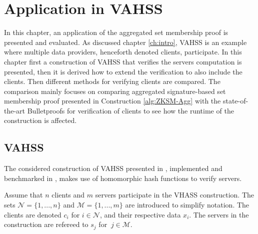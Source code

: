 \chapter{Application in VAHSS}
\label{ch:VAHSS}
In this chapter, an application of the aggregated set membership proof is presented and evaluated. As discussed chapter \ref{ch:intro}, VAHSS is an example where multiple data providers, henceforth denoted clients, participate. In this chapter first a construction of VAHSS  that verifies the servers computation is presented, then it is derived how to extend the verification to also include the clients. 
Then different methods for verifying clients are compared. The comparison   mainly focuses on comparing aggregated signature-based set membership proof presented in Construction \ref{alg:ZKSM-Agg} with the state-of-the-art Bulletproofs for verification of clients to see how the runtime of the construction is affected.


\section{VAHSS}
\label{sec:VAHSS-HSS}
The considered construction of VAHSS presented in \cite{SumItUp}, implemented and benchmarked in \cite{VAHSS}, makes use of homomorphic hash functions to verify servers.



Assume that $n$ clients and $m$ servers participate in the VHASS construction. The sets $\mathcal{N}=\{1,...,n\}$ and $\mathcal{M} = \{1,...,m\}$ are introduced to simplify notation. The clients are denoted $c_i$ for $i\in\mathcal{N}$, and their respective data $x_i$.  The servers in the construction are refereed to $s_j$ for $\:j\in\mathcal{M}$. 

